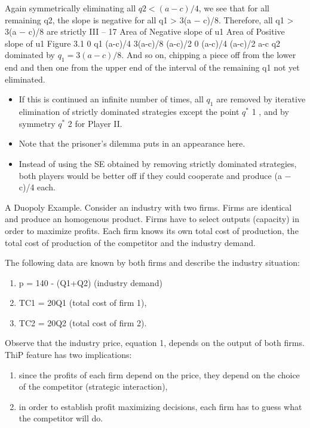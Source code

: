 \documentclass[]{article}
\begin{document}
Again symmetrically eliminating all $q2 < (a − c)/4$, we see that for all remaining q2,
the slope is negative for all q1 > 3(a − c)/8. Therefore, all q1 > 3(a − c)/8 are strictly
III – 17
Area of
Negative
slope of u1
Area of
Positive
slope of u1
Figure 3.1
0 q1 (a-c)/4 3(a-c)/8 (a-c)/2
0
(a-c)/4
(a-c)/2
a-c
q2
dominated by $q_1 = 3(a − c)/8$. And so on, chipping a piece off from the lower end and
then one from the upper end of the interval of the remaining q1 not yet eliminated.

\begin{itemize}
    \item If
this is continued an infinite number of times, all $q_1$ are removed by iterative elimination
of strictly dominated strategies except the point $q^{\ast}$
1 , and by symmetry $q^{\ast}$
2 for Player II.
\item Note that the prisoner’s dilemma puts in an appearance here. 
\item Instead of using the
SE obtained by removing strictly dominated strategies, both players would be better off if
they could cooperate and produce (a − c)/4 each.
\newpage
    
\end{itemize}
\newpage
A Duopoly Example.
Consider an industry with two firms. Firms are identical and produce an
homogenous product. Firms have to select outputs (capacity) in order to maximize
profits. Each firm knows its own total cost of production, the total cost of production of
the competitor and the industry demand.

The following data are known by both firms and describe the industry
situation:
\begin{enumerate}
    \item p = 140 - (Q1+Q2) (industry demand)
\item TC1 = 20Q1 (total cost of firm 1),
\item TC2 = 20Q2 (total cost of firm 2).
\end{enumerate}


Observe that the industry price, equation 1, depends on the output of both firms. ThiP
feature has two implications: 
\begin{enumerate}
    \item since the profits of each firm depend on the price, they
depend on the choice of the competitor (strategic interaction),
\item in order to establish
profit maximizing decisions, each firm has to guess what the competitor will do.
\end{enumerate}
\end{document}
